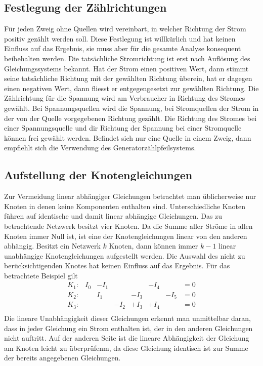 \subsection{Festlegung der Zählrichtungen}
Für jeden Zweig ohne Quellen wird vereinbart, in welcher Richtung der Strom positiv gezählt werden soll. Diese Festlegung ist willkürlich und hat keinen Einfluss auf das Ergebnis, sie muss aber für die gesamte Analyse konsequent beibehalten werden. Die tatsächliche Stromrichtung ist erst nach Auflösung des Gleichungssystems bekannt. Hat der Strom einen positiven Wert, dann stimmt seine tatsächliche Richtung mit der gewählten Richtung überein, hat er dagegen einen negativen Wert, dann fliesst er entgegengesetzt zur gewählten Richtung. Die Zählrichtung für die Spannung wird am Verbraucher in Richtung des Stromes gewählt.
\newline\newline
Bei Spannungsquellen wird die Spannung, bei Stromquellen der Strom in der von der Quelle vorgegebenen Richtung gezählt. Die Richtung des Stromes bei einer Spannungsquelle und dir Richtung der Spannung bei einer Stromquelle können frei gewählt werden. Befindet sich nur eine Quelle in einem Zweig, dann empfiehlt sich die Verwendung des Generatorzählpfeilsystems.
\subsection{Aufstellung der Knotengleichungen}
Zur Vermeidung linear abhängiger Gleichungen betrachtet man üblicherweise nur Knoten in denen keine Komponenten enthalten sind. Unterschiedliche Knoten führen auf identische und damit linear abhängige Gleichungen. Das zu betrachtende Netzwerk besitzt vier Knoten. Da die Summe aller Ströme in allen Knoten immer Null ist, ist eine der Knotengleichungen linear von den anderen abhängig. Besitzt ein Netzwerk $k$ Knoten, dann können immer $k-1$ linear unabhängige Knotengleichungen aufgestellt werden. Die Auswahl des nicht zu berücksichtigenden Knotes hat keinen Einfluss auf das Ergebnis. Für das betrachtete Beispiel gilt
\begin{equation}
\boxed{\begin{array}{llllllll}
K_1:&I_0&-I_1&&&-I_4&&=0\\
K_2:&&I_1&&-I_3&&-I_5&=0\\
K_3:&&&-I_2&+I_3&+I_4&&=0\\
\end{array}}
\end{equation}
Die lineare Unabhängigkeit dieser Gleichungen erkennt man unmittelbar daran, dass in jeder Gleichung ein Strom enthalten ist, der in den anderen Gleichungen nicht auftritt. Auf der anderen Seite ist die lineare Abhängigkeit der Gleichung am Knoten leicht zu überprüfenm, da diese Gleichung identisch ist zur Summe der bereits angegebenen Gleichungen. 

